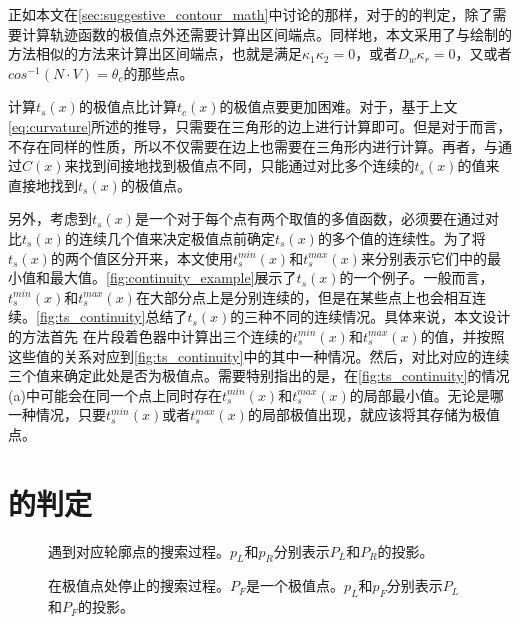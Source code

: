{\label{sec:suggestive_contour_algorithm}

正如本文在\ref{sec:suggestive_contour_math}中讨论的那样，对于\scon{}的\epsl{}的判定，除了需要计算轨迹函数的极值点外还需要计算出区间端点。同样地，本文采用了与绘制\con{}的方法相似的方法来计算出区间端点，也就是满足$\kappa_1\kappa_2 = 0$，或者$D_w\kappa_r = 0$，又或者$cos^{-1}(N\cdot{V}) = \theta_c$的那些点。

计算$t_s(x)$的极值点比计算$t_c(x)$的极值点要更加困难。对于\con{}，基于上文\autoref{eq:curvature}所述的推导，只需要在三角形的边上进行计算即可。但是对于\scon{}而言，不存在同样的性质，所以不仅需要在边上也需要在三角形内进行计算。再者，与通过$C(x)$来找到间接地找到极值点不同，只能通过对比多个连续的$t_s(x)$的值来直接地找到$t_s(x)$的极值点。

另外，考虑到$t_s(x)$是一个对于每个点有两个取值的多值函数，必须要在通过对比$t_s(x)$的连续几个值来决定极值点前确定$t_s(x)$的多个值的连续性。为了将$t_s(x)$的两个值区分开来，本文使用$t_s^{min}(x)$和$t_s^{max}(x)$来分别表示它们中的最小值和最大值。\autoref{fig:continuity_example}展示了$t_s(x)$的一个例子。一般而言，$t_s^{min}(x)$和$t_s^{max}(x)$在大部分点上是分别连续的，但是在某些点上也会相互连续。\autoref{fig:ts_continuity}总结了$t_s(x)$的三种不同的连续情况。具体来说，本文设计的方法首先
在片段着色器中计算出三个连续的$t_s^{min}(x)$和$t_s^{max}(x)$的值，并按照这些值的关系对应到\autoref{fig:ts_continuity}中的其中一种情况。然后，对比对应的连续三个值来确定此处是否为极值点。需要特别指出的是，在\autoref{fig:ts_continuity}的情况(a)中可能会在同一个点上同时存在$t_s^{min}(x)$和$t_s^{max}(x)$的局部最小值。无论是哪一种情况，只要$t_s^{min}(x)$或者$t_s^{max}(x)$的局部极值出现，就应该将其存储为极值点。

\section{\epsl{}的判定}

\begin{figure}[tbh]
    \centering
    \hfil
    \caption[遇到对应轮廓点的搜索过程]{遇到对应轮廓点的搜索过程。$p_L$和$p_R$分别表示$P_L$和$P_R$的投影。}\label{fig:succeed in image space search}
\end{figure}

\begin{figure}[tbh]
    \centering
    \hfil
    \caption[在极值点处停止的搜索过程]{在极值点处停止的搜索过程。$P_F$是一个极值点。$p_L$和$p_F$分别表示$P_L$和$P_F$的投影。} \label{fig:fail in image space search}
\end{figure}

}

